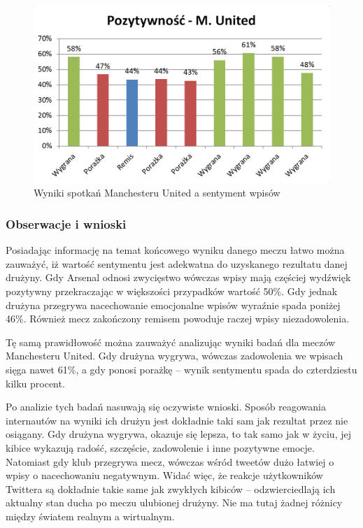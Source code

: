 \begin{figure}[ht!]
\centering
\includegraphics[width=120mm]{img/pozytywnosc-munited.png}
\caption{Wyniki spotkań Manchesteru United a sentyment wpisów}
\label{image:pozytywnosc-munited}
\end{figure}

\clearpage
\subsubsection{Obserwacje i wnioski}
Posiadając informację na temat końcowego wyniku danego meczu łatwo można 
zauważyć, iż wartość sentymentu jest adekwatna do uzyskanego rezultatu danej 
drużyny. Gdy Arsenal odnosi zwycięstwo wówczas wpisy mają częściej wydźwięk
pozytywny przekraczając w większości przypadków wartość 50\%. Gdy jednak 
drużyna przegrywa nacechowanie emocjonalne wpisów wyraźnie spada poniżej 46\%.
Również mecz zakończony remisem powoduje raczej wpisy niezadowolenia.
 
Tę samą prawidłowość można zauważyć analizując wyniki badań dla meczów
Manchesteru United. Gdy drużyna wygrywa, wówczas zadowolenia we wpisach sięga
nawet 61\%, a gdy ponosi porażkę -- wynik sentymentu spada do czterdziestu kilku
procent.

Po analizie tych badań nasuwają się oczywiste wnioski. Sposób reagowania
internautów na wyniki ich drużyn jest dokładnie taki sam jak rezultat przez nie
osiągany. Gdy drużyna wygrywa, okazuje się lepsza, to tak samo jak w życiu, jej
kibice wykazują radość, szczęście, zadowolenie i inne pozytywne emocje.
Natomiast gdy klub przegrywa mecz, wówczas wśród tweetów dużo łatwiej o wpisy o
nacechowaniu negatywnym. Widać więc, że reakcje użytkowników Twittera są
dokładnie takie same jak zwykłych kibiców -- odzwierciedlają ich aktualny stan
ducha po meczu ulubionej drużyny. Nie ma tutaj żadnej różnicy między światem
realnym a wirtualnym.

